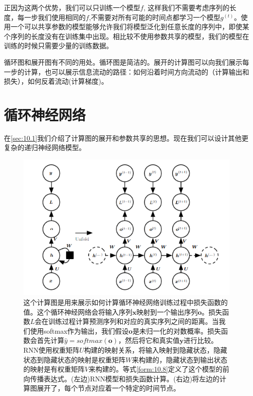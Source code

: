 正因为这两个优势，我们可以只训练一个模型$f$, 这样我们不需要考虑序列的长度，每一步我们使用相同的$f$,不需要对所有可能的时间点都学习一个模型$g^{(t)}$。使用一个可以共享参数的模型能够允许我们将模型泛化到任意长度的序列中，即使某个序列的长度没有在训练集中出现。相比较不使用参数共享的模型，我们的模型在训练的时候只需要少量的训练数据。

循环图和展开图有不同的用处。循环图是简洁的。展开的计算图可以向我们展示每一步的计算，也可以展示信息流动的路径：如何沿着时间方向流动的（计算输出和损失），如何反着流动(计算梯度)。

\section{循环神经网络}
\label{sec:10.2}
在\ref{sec:10.1}我们介绍了计算图的展开和参数共享的思想。现在我们可以设计其他更复杂的递归神经网络模型。
\begin{figure}[htbp] %
   \centering
   \includegraphics[width=6in]{fig/chap10/10_3.PNG} 
   \caption{这个计算图是用来展示如何计算循环神经网络训练过程中损失函数的值。这个循环神经网络会将输入序列$\bm{x}$映射到一个输出序列$\bm{o}$。损失函数$L$会在训练过程计算预测序列和对应的真实序列之间的距离。当我们使用softmax作为输出，我们假设$\bm{o}$是未归一化的对数概率。损失函数会首先计算$\hat{y}=softmax(\bm{o})$，然后将它和真实值$\bm{y}$进行比较。RNN使用权重矩阵$U$构建的映射关系，将输入映射到隐藏状态，隐藏状态到隐藏状态的映射是权重矩阵$W$来构建的，隐藏状态到输出状态的映射是有权重矩阵$V$来构建的。等式\ref{form:10.8}定义了这个模型的前向传播表达式。(左边)RNN模型和损失函数计算。(右边)将左边的计算图展开了，每个节点对应着一个特定的时间节点。}
   \label{fig:10_3}
\end{figure}

